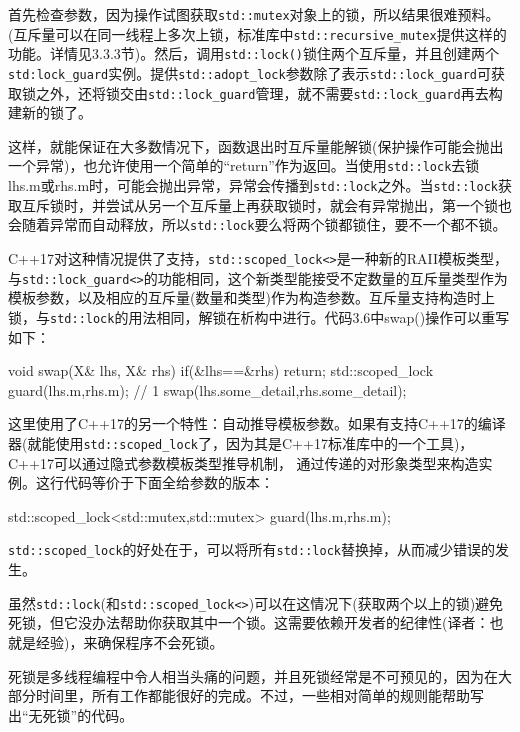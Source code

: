 首先检查参数，因为操作试图获取\texttt{std::mutex}对象上的锁，所以结果很难预料。(互斥量可以在同一线程上多次上锁，标准库中\texttt{std::recursive\_mutex}提供这样的功能。详情见3.3.3节)。然后，调用\texttt{std::lock()}锁住两个互斥量，并且创建两个\texttt{std:lock\_guard}实例。提供\texttt{std::adopt\_lock}参数除了表示\texttt{std::lock\_guard}可获取锁之外，还将锁交由\texttt{std::lock\_guard}管理，就不需要\texttt{std::lock\_guard}再去构建新的锁了。

这样，就能保证在大多数情况下，函数退出时互斥量能解锁(保护操作可能会抛出一个异常)，也允许使用一个简单的“return”作为返回。当使用\texttt{std::lock}去锁lhs.m或rhs.m时，可能会抛出异常，异常会传播到\texttt{std::lock}之外。当\texttt{std::lock}获取互斥锁时，并尝试从另一个互斥量上再获取锁时，就会有异常抛出，第一个锁也会随着异常而自动释放，所以\texttt{std::lock}要么将两个锁都锁住，要不一个都不锁。

C++17对这种情况提供了支持，\texttt{std::scoped\_lock<>}是一种新的RAII模板类型，与\texttt{std::lock\_guard<>}的功能相同，这个新类型能接受不定数量的互斥量类型作为模板参数，以及相应的互斥量(数量和类型)作为构造参数。互斥量支持构造时上锁，与\texttt{std::lock}的用法相同，解锁在析构中进行。代码3.6中swap()操作可以重写如下：

\begin{cpp}
void swap(X& lhs, X& rhs)
{
  if(&lhs==&rhs)
    return;
  std::scoped_lock guard(lhs.m,rhs.m); // 1
  swap(lhs.some_detail,rhs.some_detail);
}
\end{cpp}

这里使用了C++17的另一个特性：自动推导模板参数。如果有支持C++17的编译器(就能使用\texttt{std::scoped\_lock}了，因为其是C++17标准库中的一个工具)，C++17可以通过隐式参数模板类型推导机制， 通过传递的对形象类型来构造实例。这行代码等价于下面全给参数的版本：

\begin{cpp}
std::scoped_lock<std::mutex,std::mutex> guard(lhs.m,rhs.m);
\end{cpp}

\texttt{std::scoped\_lock}的好处在于，可以将所有\texttt{std::lock}替换掉，从而减少错误的发生。

虽然\texttt{std::lock}(和\texttt{std::scoped\_lock<>})可以在这情况下(获取两个以上的锁)避免死锁，但它没办法帮助你获取其中一个锁。这需要依赖开发者的纪律性(译者：也就是经验)，来确保程序不会死锁。

死锁是多线程编程中令人相当头痛的问题，并且死锁经常是不可预见的，因为在大部分时间里，所有工作都能很好的完成。不过，一些相对简单的规则能帮助写出“无死锁”的代码。

